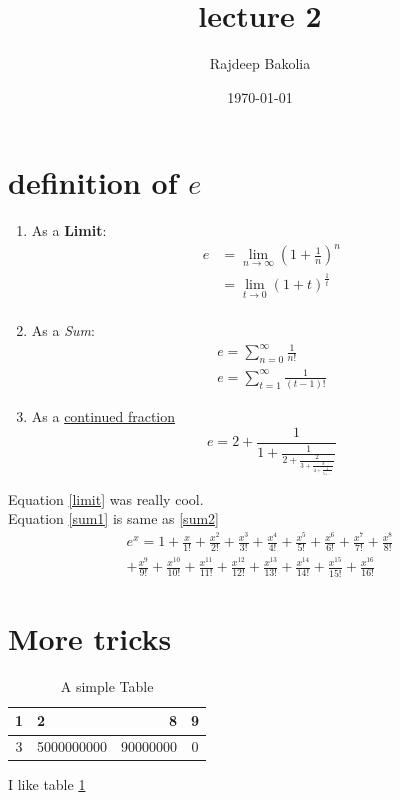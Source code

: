 \documentclass{article}
\title{lecture 2}
\author{Rajdeep Bakolia}
\date{\today}
\begin{document}
\maketitle

\section*{definition of $e$}

\begin{enumerate}
\item As a \textbf{Limit}:
\begin{equation} \label{limit}
\begin{split}
e &= \lim_{n \to \infty} \left ( 1 + \frac{1}{n}\right )^n\\
&= \lim_{t \to 0} \left ( 1 + t \right )^{\frac{1}{t}}\\
\end{split}
\end{equation}
\item As a \textit{Sum}:
\begin{align}
    \label{sum1}
    e =  \sum_{n = 0}^{\infty} \frac{1}{n!}\\
    \label{sum2}
    e = \sum_{t = 1}^{\infty} \frac{1}{(t-1)!}
\end{align}

\item As a \underline{continued fraction}
\[e = 2 + \frac{1}{1 + \frac{1}{2 + \frac{2}{3 + \frac{3}{4 + \frac{4}{5 + \ddots}}}}}\]
\end{enumerate}
Equation \ref{limit} was really cool.\\
Equation \ref{sum1} is same as \ref{sum2}\\
\begin{multline}
    e^{x} = 1 + \frac{x}{1!} + \frac{x^2}{2!} + \frac{x^3}{3!} + \frac{x^4}{4!}+ \frac{x^5}{5!} + \frac{x^6}{6!} +\frac{x^7}{7!} + \frac{x^8}{8!}\\ + \frac{x^9}{9!} + \frac{x^{10}}{10!} + \frac{x^{11}}{11!} + \frac{x^{12}}{12!} + \frac{x^{13}}{13!} + \frac{x^{14}}{14!} + \frac{x^{15}}{15!} + \frac{x^{16}}{16!} 
\end{multline}


\newpage


\section*{More tricks}


\begin{table}[H]
\caption{A simple Table}
\label{t1}
\begin{center}
\begin{tabular}{|c | l | r | c |}
    \hline
    1 & 2 & 8 & 9 \\
    \hline
    3 & 5000000000 & 90000000 & 0\\
    \hline
    
\end{tabular}
\end{center}
\end{table}
I like table \ref{t1}
\end{document}
